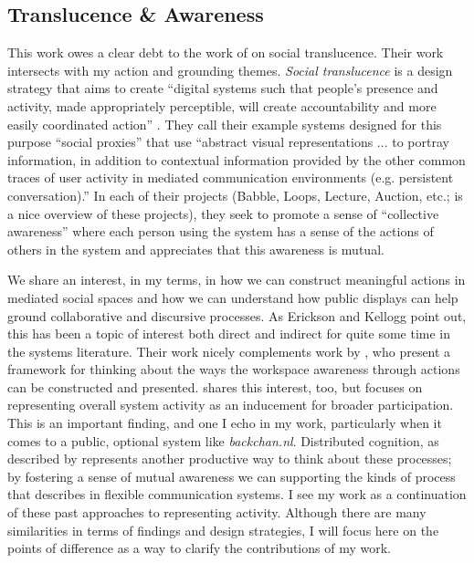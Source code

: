 \subsection{Translucence \& Awareness}

This work owes a clear debt to the work of \citet{Erickson:2000kb} on social translucence. Their work intersects with my action and grounding themes. \emph{Social translucence} is a design strategy that aims to create ``digital systems such that people's presence and activity, made appropriately perceptible, will create accountability and more easily coordinated action''  \citep{Kellogg:2002ts}. They call their example systems designed for this purpose ``social proxies'' that use ``abstract visual representations ... to portray information, in addition to contextual information provided by the other common traces of user activity in mediated communication environments (e.g. persistent conversation).'' In each of their projects (Babble, Loops, Lecture, Auction, etc.; \citep{Erickson:2003td} is a nice overview of these projects), they seek to promote a sense of ``collective awareness'' where each person using the system has a sense of the actions of others in the system and appreciates that this awareness is mutual. 

We share an interest, in my terms, in how we can construct meaningful actions in mediated social spaces and how we can understand how public displays can help ground collaborative and discursive processes. As Erickson and Kellogg point out, this has been a topic of interest both direct and indirect for quite some time in the systems literature. Their work nicely complements work by \citet{Gutwin:2002tf}, who present a framework for thinking about the ways the workspace awareness through actions can be constructed and presented.  \citet{Ackerman:1995tj} shares this interest, too, but focuses on representing overall system activity as an inducement for broader participation. This is an important finding, and one I echo in my work, particularly when it comes to a public, optional system like \emph{backchan.nl}. Distributed cognition, as described by \citet{Hollan:2000ud} represents another productive way to think about these processes; by fostering a sense of mutual awareness we can supporting the kinds of process that \citet{Hutchins:1995ud} describes in flexible communication systems. I see my work as a continuation of these past approaches to representing activity. Although there are many similarities in terms of findings and design strategies, I will focus here on the points of difference as a way to clarify the contributions of my work.

